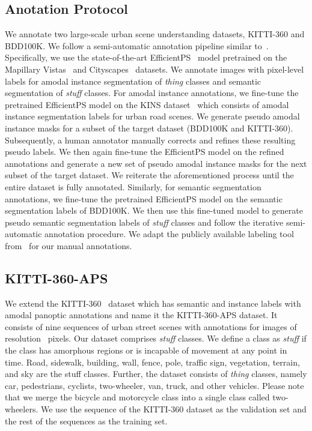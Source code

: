 \documentclass[10pt,twocolumn,letterpaper]{article}
\begin{document}
\subsection{Anotation Protocol}

We annotate two large-scale urban scene understanding datasets, KITTI-360 and BDD100K. We follow a semi-automatic annotation pipeline similar to~\cite{voigtlaender2019mots}. Specifically, we use the state-of-the-art EfficientPS~\cite{mohan2020efficientps} model pretrained on the Mapillary Vistas~\cite{neuhold2017mapillary} and Cityscapes~\cite{cordts2016cityscapes} datasets. We annotate images with pixel-level labels for amodal instance segmentation of \textit{thing} classes and semantic segmentation of \textit{stuff} classes. For amodal instance annotations, we fine-tune the pretrained EfficientPS model on the KINS dataset~\cite{qi2019amodal} which consists of amodal instance segmentation labels for urban road scenes. We generate pseudo amodal instance masks for a subset of the target dataset (BDD100K and KITTI-360). Subsequently, a human annotator manually corrects and refines these resulting pseudo labels. We then again fine-tune the EfficientPS model on the refined annotations and generate a new set of pseudo amodal instance masks for the next subset of the target dataset. We reiterate the aforementioned process until the entire dataset is fully annotated. Similarly, for semantic segmentation annotations, we fine-tune the pretrained EfficientPS model on the semantic segmentation labels of BDD100K. We then use this fine-tuned model to generate pseudo semantic segmentation labels of \textit{stuff} classes and follow the iterative semi-automatic annotation procedure. We adapt the publicly available labeling tool from~\cite{cordts2016cityscapes} for our manual annotations.

\subsection{KITTI-360-APS}

We extend the KITTI-360~\cite{Liao2021ARXIV} dataset which has semantic and instance labels with amodal panoptic annotations and name it the KITTI-360-APS dataset. It consists of nine sequences of urban street scenes with annotations for  images of resolution ~pixels. Our dataset comprises  \textit{stuff} classes. We define a class as \textit{stuff} if the class has amorphous regions or is incapable of movement at any point in time. Road, sidewalk, building, wall, fence, pole, traffic sign, vegetation, terrain, and sky are the stuff classes. Further, the dataset consists of  \textit{thing} classes, namely car, pedestrians, cyclists, two-wheeler, van, truck, and other vehicles. Please note that we merge the bicycle and motorcycle class into a single class called two-wheelers. We use the sequence  of the KITTI-360 dataset as the validation set and the rest of the sequences as the training set.
\end{document}
